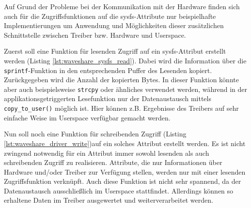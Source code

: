 Auf Grund der Probleme bei der Kommunikation mit der Hardware finden sich auch für die Zugriffsfunktionen auf die sysfs-Attribute nur beispielhafte Implementierungen um Anwendung und Möglichkeiten dieser zusätzlichen Schnittstelle zwischen Treiber bzw. Hardware und Userspace.  

Zuerst soll eine Funktion für lesenden Zugriff auf ein sysfs-Attribut erstellt werden (Listing \ref{lst:waveshare_sysfs_read}). Dabei wird die Information über die \texttt{sprintf}-Funktion in den entsprechenden Puffer des Lesenden kopiert. Zurückgegeben wird die Anzahl der kopierten Bytes. In dieser Funktion könnte aber auch beispielsweise \texttt{strcpy} oder ähnliches verwendet werden, während in der applikationsgetriggerten Lesefunktion nur der Datenaustausch mittels \texttt{copy\_to\_user()} möglich ist. 
Hier können z.B. Ergebnisse des Treibers auf sehr einfache Weise im Userspace verfügbar gemacht werden.




Nun soll noch eine Funktion für schreibenden Zugriff (Listing \ref{lst:waveshare_driver_write})auf ein solches Attribut erstellt werden. Es ist nicht zwingend notwendig für ein Attribut immer sowohl lesenden als auch schreibenden Zugriff zu realisieren. Attribute, die nur Informationen über Hardware und/oder Treiber zur Verfügung stellen, werden nur mit einer lesenden Zugriffsfunktion verknüpft.
Auch diese Funktion ist nicht sehr spannend, da der Datenaustausch ausschließlich im Userspace stattfindet. Allerdings können so erhaltene Daten im Treiber ausgewertet und weiterverarbeitet werden.



